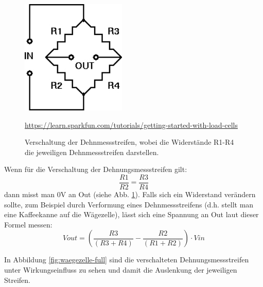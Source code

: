 \begin{figure}[H]
    \center
    \includegraphics[width=5cm]{Bilder/waegezelle-verschaltung.jpg}\\
    \caption{Verschaltung der Dehnmessstreifen, wobei die Widerstände R1-R4 die jeweiligen Dehnmessstreifen darstellen.}
    \begin{flushleft} \quelle\url{https://learn.sparkfun.com/tutorials/getting-started-with-load-cells} \end{flushleft}
    \label{fig:waegezelle-verschaltung}
\end{figure}
\noindent
Wenn für die Verschaltung der Dehnungsmessstreifen gilt: 
\begin{equation}
    \frac{R1}{R2}=\frac{R3}{R4}
\end{equation}
dann misst man 0V an Out (siehe Abb. \ref{fig:waegezelle-verschaltung}). Falls sich ein Widerstand verändern sollte, zum Beispiel durch Verformung eines Dehnmessstreifens (d.h. stellt man eine Kaffeekanne auf die Wägezelle), lässt sich eine Spannung an Out laut dieser Formel messen: \\
\begin{equation}
    Vout=(\frac{R3}{(R3+R4)}-\frac{R2}{(R1+R2)}) \cdot Vin
\end{equation}

\noindent
In Abbildung \ref{fig:waegezelle-full} sind die verschalteten Dehnungsmessstreifen unter Wirkungseinfluss zu sehen und damit die Auslenkung der jeweiligen Streifen.

